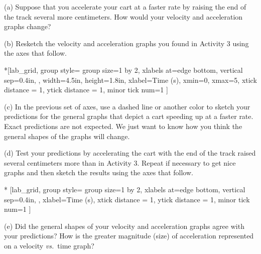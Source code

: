 (a) Suppose that you accelerate your cart at a faster rate by raising the end of the track several more centimeters. How would your velocity and acceleration graphs change? 
\answerspace{15mm}

(b) Resketch the velocity and acceleration graphs you found in Activity 3 using
the axes that follow.


\begin{lab_groupplot}*{}[lab_grid,
	group style={
		group size=1 by 2,
		xlabels at=edge bottom,
		vertical sep=0.4in,
		},
	width=4.5in,  height=1.8in,
	xlabel=Time (s),
	xmin=0, xmax=5,
	xtick distance = 1, 
	ytick distance = 1, 
	minor tick num=1
	]
\nextgroupplot[
	ymin=-1,ymax=1, 
	ylabel={Velocity (m/s)},
	]
\nextgroupplot[
	ymin=-1,ymax=1, 
	ylabel={Acceleration (m/s$^2$)},
	]
\end{lab_groupplot}

(c) In the previous set of axes, use a dashed line or another color to sketch
your predictions for the general graphs that depict a cart speeding up at a
faster rate. Exact predictions are not expected. We just want to know how you
think the general shapes of the graphs will change.

\pagebreak[2]
(d) Test your predictions by accelerating the cart with the end of the track raised several centimeters more than in Activity 3. Repeat if necessary to get nice graphs and then sketch the results using the axes that follow.

\begin{lab_groupplot}*{}
					[lab_grid,
	group style={
		group size=1 by 2,
		xlabels at=edge bottom,
		vertical sep=0.4in,
		},
	xlabel=Time (s),
	xtick distance = 1, 
	ytick distance = 1, 
	minor tick num=1
	]
\nextgroupplot[
	ylabel={Velocity (m/s)},
	]
\nextgroupplot[
	ylabel={Acceleration (m/s$^2$)},
	]
\end{lab_groupplot}

(e) Did the general shapes of your velocity and acceleration graphs agree with
your predictions? How is the greater magnitude (size) of acceleration represented
on a velocity \textit{vs.}~time graph? 
\answerspace{25mm}


